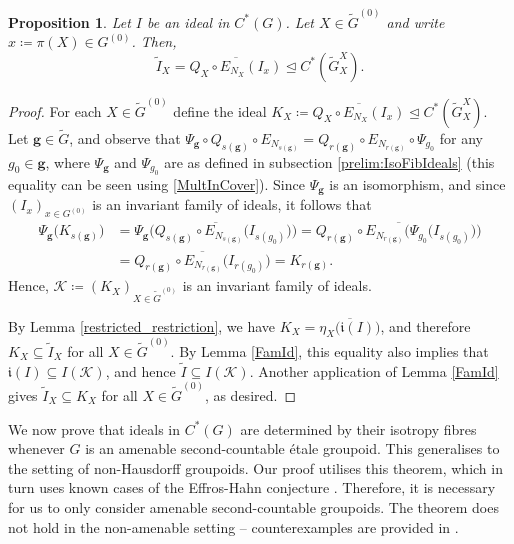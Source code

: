 \documentclass[11pt, oneside, reqno]{amsart}
\newcommand{\Gu}{G^{(0)}}
\newcommand{\tiG}{\tilde{G}}
\newcommand{\tiGu}{\tilde{G}^{(0)}}
\newcommand{\mfi}{\mathfrak i}
\newtheorem{prp}[thm]{Proposition}
\theoremstyle{definition}
\theoremstyle{remark}
\numberwithin{equation}{section}
\begin{document}
\begin{prp}\label{DescribeIsoFib}
    Let $I$ be an ideal in $C^*(G)$. Let $X \in \tiGu$ and write $x \coloneq \pi(X) \in \Gu$. Then,
    \[
    \tilde{I}_X = \overline{Q_{X}\circ E_{N_{X}}(I_{x})} \trianglelefteq C^*(\tiG^X_X).
    \]
\end{prp}

\begin{proof}
 For each $X \in \tiGu$ define the ideal $K_X \coloneq \overline{Q_{X} \circ E_{N_{X}}(I_{x})} \trianglelefteq C^*(\tiG^X_X)$. Let $\bm{g} \in \tiG$, and observe that $\Psi_{\bm{g}} \circ Q_{s(\bm{g})} \circ E_{N_{s(\bm{g})}} = Q_{r(\bm{g})} \circ E_{N_{r(\bm{g})}} \circ \Psi_{g_0}$ for any $g_0 \in \bm{g}$, where $\Psi_{\bm{g}}$ and $\Psi_{g_0}$ are as defined in subsection \ref{prelim:IsoFibIdeals} (this equality can be seen using \eqref{MultInCover}). Since $\Psi_{\bm{g}}$ is an isomorphism, and since $(I_x)_{x \in \Gu}$ is an invariant family of ideals, it follows that
    \begin{align*}
    \Psi_{\bm{g}}\big(K_{s(\bm{g})}\big)
    &= \overline{\Psi_{\bm{g}}\Big(Q_{s(\bm{g})} \circ E_{N_{s(\bm{g})}}\big(I_{s(g_0)}\big)\Big)}
    = \overline{Q_{r(\bm{g})} \circ E_{N_{r(\bm{g})}}\Big(\Psi_{g_0}\big(I_{s(g_0)}\big)\Big)}\\
    &= \overline{Q_{r(\bm{g})} \circ E_{N_{r(\bm{g})}}\big(I_{r(g_0)}\big)}
    = K_{r(\bm{g})}.
    \end{align*}
    Hence, $\mathcal{K} \coloneq (K_X)_{X \in \tiGu}$ is an invariant family of ideals. 
    
    By Lemma \ref{restricted_restriction}, we have $K_X = \overline{\eta_X\big(\mfi(I)\big)}$, and therefore $K_X \subseteq \tilde{I}_X$ for all $X \in \tiGu$. By Lemma \ref{FamId}, this equality also implies that $\mfi(I) \subseteq I(\mathcal{K})$, and hence $\tilde{I} \subseteq I(\mathcal{K})$. Another application of Lemma \ref{FamId} gives $\tilde{I}_X \subseteq K_X$ for all $X \in \tiGu$, as desired.
\end{proof}



We now prove that ideals in $C^*(G)$ are determined by their isotropy fibres whenever $G$ is an amenable second-countable \'etale groupoid. This generalises \cite[Theorem~2.10]{CN24} to the setting of non-Hausdorff groupoids. Our proof utilises this theorem, which in turn uses known cases of the Effros-Hahn conjecture \cite{IW08}. Therefore, it is necessary for us to only consider amenable second-countable groupoids. The theorem does not hold in the non-amenable setting -- counterexamples are provided in \cite[Examples 2.11 \& 2.12]{CN24}.
\end{document}
